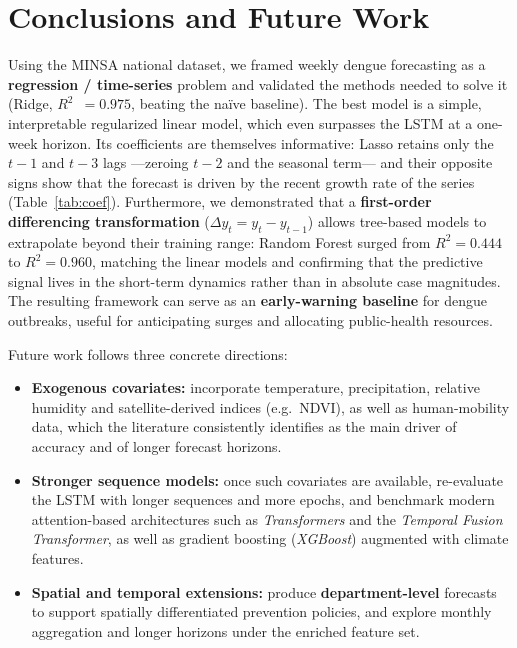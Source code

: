 \documentclass[runningheads]{llncs}
\newcommand{\Rsq}{$R^2$}
\begin{document}
\section{Conclusions and Future Work}
Using the MINSA national dataset, we framed weekly dengue forecasting as a
\textbf{regression / time-series} problem and validated the methods needed to solve it
(Ridge, \Rsq{}~$=0.975$, beating the na\"ive baseline). The best model is a simple,
interpretable regularized linear model, which even surpasses the LSTM at a one-week horizon.
Its coefficients are themselves informative: Lasso retains only the $t{-}1$ and $t{-}3$ lags
---zeroing $t{-}2$ and the seasonal term--- and their opposite signs show that the forecast
is driven by the recent growth rate of the series (Table~\ref{tab:coef}).
Furthermore, we demonstrated that a \textbf{first-order differencing transformation}
($\Delta y_t = y_t - y_{t-1}$) allows tree-based models to extrapolate beyond their training
range: Random Forest surged from $R^2=0.444$ to $R^2=0.960$, matching the linear models and
confirming that the predictive signal lives in the short-term dynamics rather than in
absolute case magnitudes.
The resulting framework can serve as an \textbf{early-warning baseline} for dengue outbreaks,
useful for anticipating surges and allocating public-health resources.

Future work follows three concrete directions:
\begin{itemize}\itemsep1pt
  \item \textbf{Exogenous covariates:} incorporate temperature, precipitation, relative
  humidity and satellite-derived indices (e.g.\ NDVI), as well as human-mobility data, which
  the literature consistently identifies as the main driver of accuracy and of longer
  forecast horizons.
  \item \textbf{Stronger sequence models:} once such covariates are available, re-evaluate the
  LSTM with longer sequences and more epochs, and benchmark modern attention-based
  architectures such as \emph{Transformers} and the \emph{Temporal Fusion Transformer}, as
  well as gradient boosting (\emph{XGBoost}) augmented with climate features.
  \item \textbf{Spatial and temporal extensions:} produce \textbf{department-level} forecasts
  to support spatially differentiated prevention policies, and explore monthly aggregation and
  longer horizons under the enriched feature set.
\end{itemize}
\end{document}
